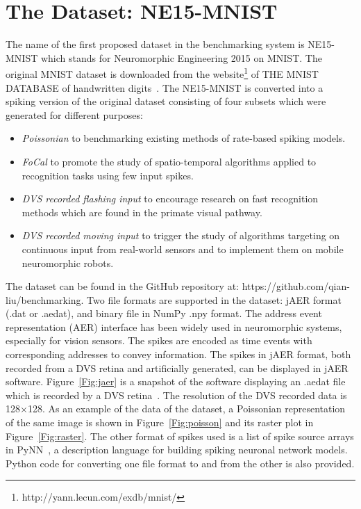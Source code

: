 \documentclass[journal]{journal}
\begin{document}
\section{The Dataset: NE15-MNIST}
	The name of the first proposed dataset in the benchmarking system is NE15-MNIST which stands for Neuromorphic Engineering 2015 on MNIST.
	The original MNIST dataset is downloaded from the website\footnote{http://yann.lecun.com/exdb/mnist/} of THE MNIST DATABASE of handwritten digits~\cite{lecun1998gradient}.
	The NE15-MNIST is converted into a spiking version of the original dataset consisting of four subsets which were generated for different purposes:
	\begin{itemize}
		\item \textit{Poissonian}
		to benchmarking existing methods of rate-based spiking models.
		\item \textit{FoCal}
		to promote the study of spatio-temporal algorithms applied to recognition tasks using few input spikes.
		\item \textit{DVS recorded flashing input}
		to encourage research on fast recognition methods which are found in the primate visual pathway.
		\item \textit{DVS recorded moving input}
		to trigger the study of algorithms targeting on continuous input from real-world sensors and to implement them on mobile neuromorphic robots.
	\end{itemize}
	The dataset can be found in the GitHub repository at: https://github.com/qian-liu/benchmarking.
%	
	Two file formats are supported in the dataset: jAER format~\cite{delbruck2008frame} (.dat or .aedat), and binary file in NumPy .npy format.
	The  address event representation (AER) interface has been widely used in neuromorphic systems, especially for vision sensors.
	The spikes are encoded as time events with corresponding addresses to convey information.
	The spikes in jAER format, both recorded from a DVS retina and artificially generated, can be displayed in jAER software.
	Figure~\ref{Fig:jaer} is a snapshot of the software displaying an .aedat file which is recorded by a DVS retina~\cite{serrano2013128}.
	The resolution of the DVS recorded data is 128$\times$128.
	As an example of the data of the dataset, a Poissonian representation of the same image is shown in Figure~\ref{Fig:poisson} and its raster plot in Figure~\ref{Fig:raster}.
	The other format of spikes used is a list of spike source arrays in PyNN~\cite{davison2008pynn}, a description language for building spiking neuronal network models.
	Python code for converting one file format to and from the other is also provided.
	
\end{document}

